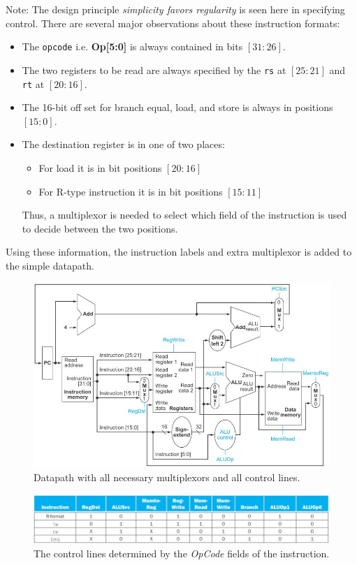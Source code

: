 \documentclass[10pt,a4paper]{article}
\begin{document}
Note: The design principle \textit{simplicity favors regularity} is seen here in specifying control.
There are several major observations about these instruction formats:
\begin{itemize}
    \item The \texttt{opcode} i.e. \textbf{Op[5:0]} is always contained in bits $[31:26]$.
    \item The two registers to be read are always specified by the \texttt{rs} at $[25:21]$ and
    \texttt{rt} at $[20:16]$. 
    \item The 16-bit off set for branch equal, load, and store is always in positions $[15:0]$.
    \item The destination register is in one of two places:
    \begin{itemize}
        \item For load it is in bit positions $[20:16]$
        \item For R-type instruction it is in bit positions $[15:11]$
    \end{itemize}

    Thus, a multiplexor is needed to select which field of the instruction is used to decide between
    the two positions.
\end{itemize}

Using these information, the instruction labels and extra multiplexor is added to the simple datapath. 
\begin{figure} [h!]
    \centering
    \includegraphics[scale=0.8]{Data path 2.JPG}
    \caption{Datapath with all necessary multiplexors and all control lines.}
\end{figure}

\begin{figure} [h!]
    \centering
    \includegraphics[scale=0.7]{R type control.JPG}
    \caption{The control lines determined by the \textit{OpCode} ﬁelds of the instruction.}
\end{figure}
\end{document}

